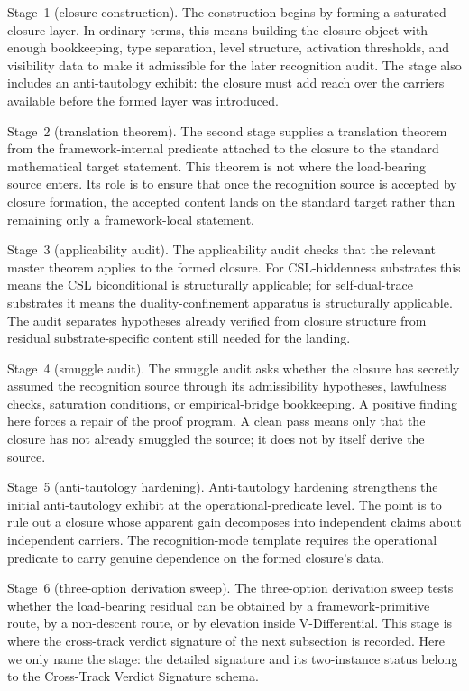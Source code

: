 \documentclass[11pt]{article}
\newcommand{\StageOne}{Stage~1 (closure construction)}
\newcommand{\StageTwo}{Stage~2 (translation theorem)}
\newcommand{\StageThree}{Stage~3 (applicability audit)}
\newcommand{\StageFour}{Stage~4 (smuggle audit)}
\newcommand{\StageFive}{Stage~5 (anti-tautology hardening)}
\newcommand{\StageSix}{Stage~6 (three-option derivation sweep)}
\theoremstyle{definition}
\begin{document}
\StageOne. The construction begins by forming a saturated closure layer.
In ordinary terms, this means building the closure object with enough
bookkeeping, type separation, level structure, activation thresholds, and
visibility data to make it admissible for the later recognition audit. The
stage also includes an anti-tautology exhibit: the closure must add reach
over the carriers available before the formed layer was introduced.

\StageTwo. The second stage supplies a translation theorem from the
framework-internal predicate attached to the closure to the standard
mathematical target statement. This theorem is not where the
load-bearing source enters. Its role is to ensure that once the
recognition source is accepted by closure formation, the accepted content
lands on the standard target rather than remaining only a framework-local
statement.

\StageThree. The applicability audit checks that the relevant master
theorem applies to the formed closure. For CSL-hiddenness substrates this
means the CSL biconditional is structurally applicable; for
self-dual-trace substrates it means the duality-confinement apparatus is
structurally applicable. The audit separates hypotheses already verified
from closure structure from residual substrate-specific content still
needed for the landing.

\StageFour. The smuggle audit asks whether the closure has secretly
assumed the recognition source through its admissibility hypotheses,
lawfulness checks, saturation conditions, or empirical-bridge
bookkeeping. A positive finding here forces a repair of the proof program.
A clean pass means only that the closure has not already smuggled the
source; it does not by itself derive the source.

\StageFive. Anti-tautology hardening strengthens the initial
anti-tautology exhibit at the operational-predicate level. The point is
to rule out a closure whose apparent gain decomposes into independent
claims about independent carriers. The recognition-mode template requires
the operational predicate to carry genuine dependence on the formed
closure's data.

\StageSix. The three-option derivation sweep tests whether the
load-bearing residual can be obtained by a framework-primitive route, by
a non-descent route, or by elevation inside V-Differential. This stage is
where the cross-track verdict signature of the next subsection is
recorded. Here we only name the stage: the detailed signature and its
two-instance status belong to the Cross-Track Verdict Signature schema.
\end{document}
